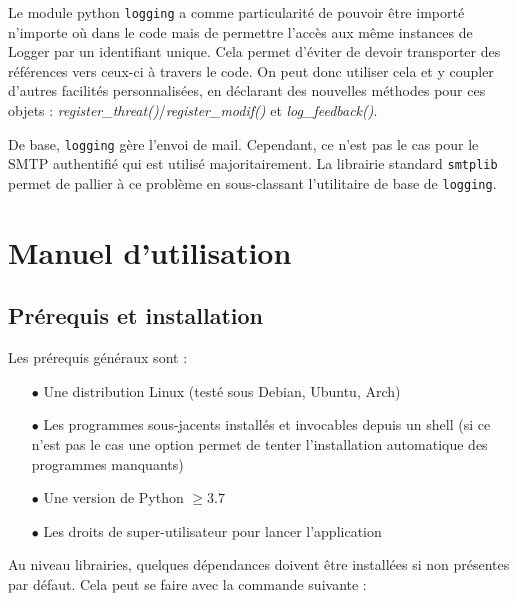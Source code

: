 \documentclass[]{article}
\begin{document}
Le module python \texttt{logging} a comme particularité de pouvoir être importé n'importe où dans le code mais de permettre l'accès aux même instances de Logger par un identifiant unique. Cela permet d'éviter de devoir transporter des références vers ceux-ci à travers le code. On peut donc utiliser cela et y coupler d'autres facilités personnalisées, en déclarant des nouvelles méthodes pour ces objets : \textit{register\_threat()}/\textit{register\_modif()} et \textit{log\_feedback()}.\\

\par De base, \texttt{logging} gère l'envoi de mail. Cependant, ce n'est pas le cas pour le SMTP authentifié qui est utilisé majoritairement. La librairie standard \texttt{smtplib} permet de pallier à ce problème en sous-classant l'utilitaire de base de \texttt{logging}.



\newpage

\section{Manuel d'utilisation}
\label{manuel}

\subsection{Prérequis et installation}
\label{install}
Les prérequis généraux sont :
\begin{itemize}
\vspace{0.1cm}
\item[$\bullet$] Une distribution Linux (testé sous Debian, Ubuntu, Arch)
\vspace{0.1cm}
\item[$\bullet$] Les programmes sous-jacents installés et invocables depuis un shell (si ce n'est pas le cas une option permet de tenter l'installation automatique des programmes manquants)
\vspace{0.1cm}
\item[$\bullet$] Une version de Python $\geq 3.7$
\vspace{0.1cm}
\item[$\bullet$] Les droits de super-utilisateur pour lancer l'application
\end{itemize}
\vspace{0.1cm}

Au niveau librairies, quelques dépendances doivent être installées si non présentes par défaut. Cela peut se faire avec la commande suivante :\\
\end{document}
